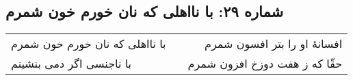 \begin{center}
\section*{شماره ۲۹: با نااهلی که نان خورم خون شمرم}
\label{sec:029}
\begin{longtable}{l p{0.5cm} r}
با نااهلی که نان خورم خون شمرم
&&
افسانهٔ او را بتر افسون شمرم
\\
با ناجنسی اگر دمی بنشینم
&&
حقّا که ز هفت دوزخ افزون شمرم
\\
\end{longtable}
\end{center}
